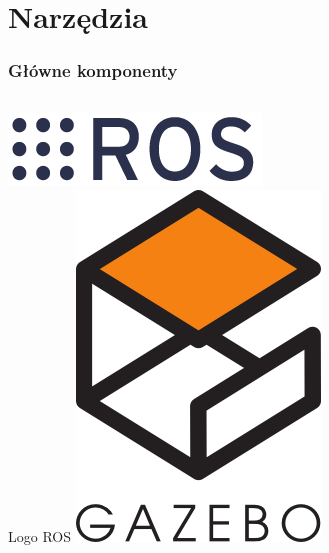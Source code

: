 \documentclass{beamer}
\begin{document}
	\section{Narzędzia}
	\begin{frame}
		\frametitle{Główne komponenty}
		\begin{columns}[c]
			\centering
			\includegraphics[width=\textwidth]{graphics/ros_logo.png} \\
			Logo ROS\footnotemark[1]
			\centering
			\includegraphics[width=\textwidth]{graphics/gazebo_logo.png} \\

\end{columns}
\end{frame}
\end{document}
